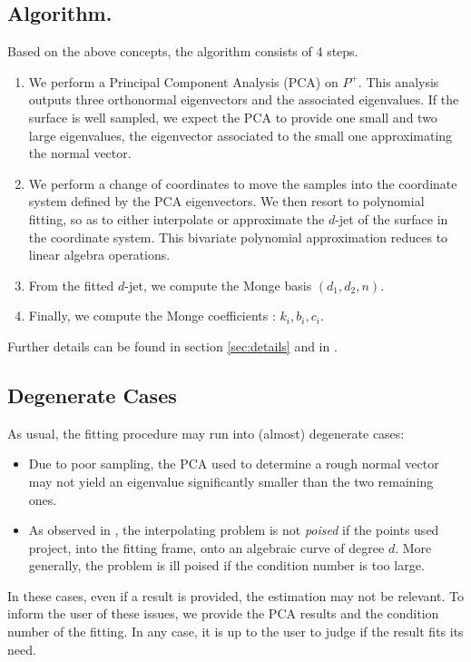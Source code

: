 \subsection{Algorithm.}
%
Based on the above concepts, the algorithm consists of 4 steps.
%
\begin{enumerate}
\item
We perform a Principal Component Analysis (PCA) on $P^+$. This
analysis outputs three orthonormal eigenvectors and the associated
eigenvalues.  If the surface is well sampled, we expect the PCA to
provide one small and two large eigenvalues, the eigenvector
associated to the small one approximating the normal vector.
\item
We perform a change of coordinates to move the samples into the
coordinate system defined by the PCA eigenvectors. We then resort to
polynomial fitting, so as to either interpolate or approximate the
$d$-jet of the surface in the coordinate system. This bivariate
polynomial approximation reduces to linear algebra operations.
\item
From the fitted $d$-jet, we compute the Monge basis $(d_1,d_2,n)$.
\item
Finally, we compute the Monge coefficients : $k_i, b_i, c_i$.
\end{enumerate}

Further details can be found in section \ref{sec:details} and in
\cite{cgal:cp-edqpf-05}.

\subsection{Degenerate Cases}
\label{sec:deg-cases}

As usual, the  fitting procedure may run into (almost) degenerate
cases:
\begin{itemize}
\item
Due to poor sampling, the PCA used to determine a rough normal vector
may not yield an eigenvalue significantly smaller than the two
remaining ones.

\item
As observed in \cite{cgal:cp-edqpf-05}, the interpolating problem is
not {\em poised} if the points used project, into the fitting frame,
onto an algebraic curve of degree $d$. More generally, the problem is
ill poised if the condition number is too large.
\end{itemize}
In these cases, even if a result is provided, the estimation may not
be relevant. To inform the user of these issues, we provide the PCA
results and the condition number of the fitting. In any case, it is up
to the user to judge if the result fits its need.


